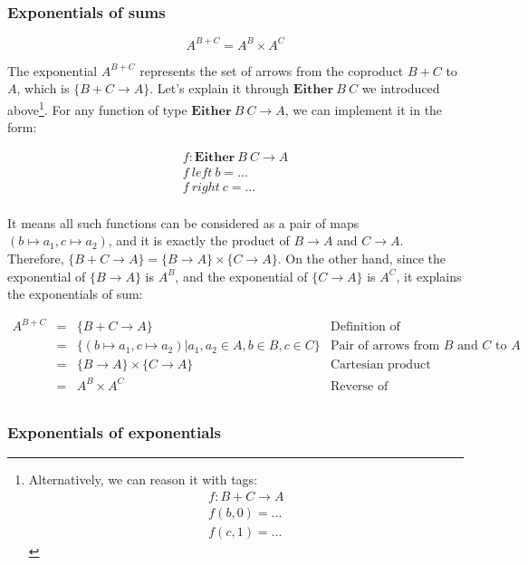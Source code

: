 \documentclass{article}
\begin{document}
\subsubsection{Exponentials of sums}

\[
  A^{B + C} = A^B \times A^C
\]

The exponential $A^{B+C}$ represents the set of arrows from the coproduct $B+C$ to $A$, which is $\{B + C \to A\}$. Let's explain it through $\mathbf{Either}\ B\ C$ we introduced above\footnote{Alternatively, we can reason it with tags:
\[
\begin{array}{l}
f : B + C \to A \\
f (b, 0) = ... \\
f (c, 1) = ...
\end{array}
\]
}. For any function of type $\mathbf{Either}\ B\ C \to A$, we can implement it in the form:

\[
\begin{array}{l}
f : \mathbf{Either}\ B\ C \to A \\
f\ left\ b = ... \\
f\ right\ c = ... \\
\end{array}
\]

It means all such functions can be considered as a pair of maps $(b \mapsto a_1, c \mapsto a_2)$, and it is exactly the product of $B \to A$ and $C \to A$. Therefore, $\{B + C \to A\} = \{B \to A\} \times \{C \to A\}$. On the other hand, since the exponential of $\{B \to A\}$ is $A^B$, and the exponential of $\{C \to A\}$ is $A^C$, it explains the exponentials of sum:

\[
\begin{array}{rcll}
A^{B + C} & = & \{ B + C \to A \} & \text{Definition of exponentials} \\
    & = & \{ (b \mapsto a_1,  c \mapsto a_2) | a_1, a_2 \in A, b \in B, c \in C\} & \text{Pair of arrows from $B$ and $C$ to $A$} \\
    & = & \{ B \to A \} \times \{ C \to A \} & \text{Cartesian product} \\
    & = & A^B \times A^C & \text{Reverse of exponentials} \\
\end{array}
\]

\subsubsection{Exponentials of exponentials}
\end{document}
